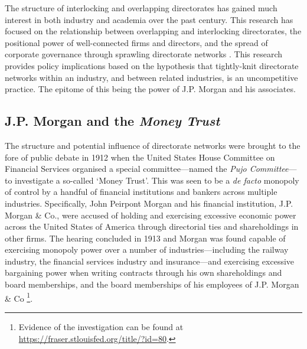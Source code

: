 \documentclass[11pt,fleqn]{article}
\begin{document}
The structure of interlocking and overlapping directorates has gained much interest in both industry and academia over the past century. This research has focused on the relationship between overlapping and interlocking directorates, the positional power of well-connected firms and directors, and the spread of corporate governance through sprawling directorate networks \citep{RoyBonacich1988}. This research provides policy implications based on the hypothesis that tightly-knit directorate networks within an industry, and between related industries, is an uncompetitive practice. The epitome of this being the power of J.P. Morgan and his associates.

\subsection{J.P. Morgan and the \emph{Money Trust}}

The structure and potential influence of directorate networks were brought to the fore of public debate in 1912 when the United States House Committee on Financial Services organised a special committee---named the \emph{Pujo Committee}---to investigate a so-called `Money Trust'. This was seen to be a \emph{de facto} monopoly of control by a handful of financial institutions and bankers across multiple industries. Specifically, John Peirpont Morgan and his financial institution, J.P. Morgan \& Co., were accused of holding and exercising excessive economic power across the United States of America through directorial ties and shareholdings in other firms. The hearing concluded in 1913 and Morgan was found capable of exercising monopoly power over a number of industries---including the railway industry, the financial services industry and insurance---and exercising excessive bargaining power when writing contracts through his own shareholdings and board memberships, and the board memberships of his employees of J.P. Morgan \& Co \footnote{Evidence of the investigation can be found at \href{https://fraser.stlouisfed.org/title/?id=80}{https://fraser.stlouisfed.org/title/?id=80}.}.
\end{document}
